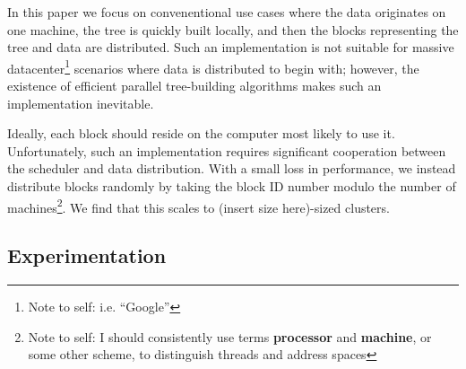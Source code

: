 \documentclass[times, leqno,twocolumn]{article}
\newcommand{\authornote}[1]{\footnote{Note to self: #1}}
\newcommand{\authorsnote}[1]{\authornote{#1}}
\newcommand{\defterm}[1]{{\bf #1}}
\begin{document}
In this paper we focus on convenentional use cases where the data originates on one machine, the tree is quickly built locally, and then the blocks representing the tree and data are distributed.
Such an implementation is not suitable for massive datacenter\authorsnote{i.e. ``Google''} scenarios where data is distributed to begin with; however, the existence of efficient parallel tree-building algorithms \cite{paralleltrees} makes such an implementation inevitable.

Ideally, each block should reside on the computer most likely to use it.
Unfortunately, such an implementation requires significant cooperation between the scheduler and data distribution.
With a small loss in performance, we instead distribute blocks randomly by taking the block ID number modulo the number of machines\authorsnote{I should consistently use terms \defterm{processor} and \defterm{machine}, or some other scheme, to distinguish threads and address spaces}.
We find that this scales to (insert size here)-sized clusters.

\subsection{Experimentation}

\nocite{ex1,ex2}


\end{document}

